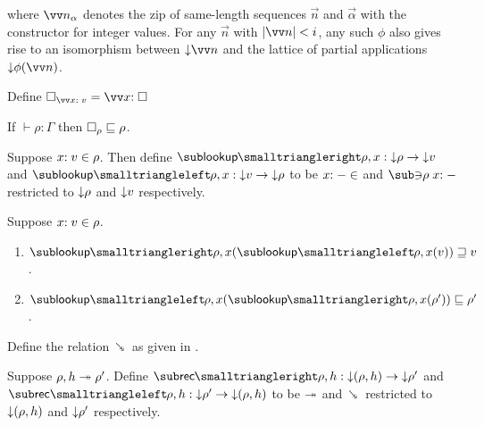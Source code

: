 \noindent where $\vec{\annInt{n}{\alpha}}$ denotes the zip of same-length sequences $\vec{n}$ and $\vec{\alpha}$ with the constructor for integer values. For any $\vec{n}$ with $\length{\vec{n}} \numlt i$, any such $\phi$ also gives rise to an isomorphism between $\Below{\vec{n}}$ and the lattice of partial applications $\Below{\exPrimOp{\phi}{\vec{n}}}$.





\begin{definition}
Define $\hole_{\vec{\bind{x}{v}}} = \vec{\bind{x}{\hole}}$
\end{definition}

\begin{lemma}
\label{lem:core-language:hole-env}If $\vdash \rho: \Gamma$ then $\square_{\rho} \sqsubseteq \rho$.
\end{lemma}

\begin{definition}
   Suppose $x{:}\;v\in{\rho}$. Then define $\envLookupFwdF{\rho,x}: \Below{\rho} \to \Below{v}$ and $\envLookupBwdF{\rho,x}: \Below{v} \to \Below{\rho}$ to be $x{:}\;-\in$ and $\envLookupBwdR{\rho}\bind{x}{-}$ restricted to ${\downarrow}{\rho}$ and ${\downarrow}{v}$ respectively.
\end{definition}

\begin{lemma}
\label{lem:core-language:env-get-put}Suppose $x{:}\;v\in{\rho}$.
\begin{enumerate}
   \item \label{lem:core-language:env-get-put:1} $\envLookupFwdF{\rho,x}(\envLookupBwdF{\rho,x}(v)) \geq v$.
   \item \label{lem:core-language:env-get-put:2} $\envLookupBwdF{\rho,x}(\envLookupFwdF{\rho,x}(\rho')) \leq \rho'$.
\end{enumerate}
\end{lemma}

\begin{definition}
   \label{def:core-language:closeDefs-bwd}
   Define the relation $\closeDefsBwdR$ as given in .
\end{definition}

\begin{definition}
   Suppose $\rho, h \twoheadrightarrow \rho'$. Define $\closeDefsFwdF{\rho,h}: \Below{(\rho, h)} \to \Below{\rho'}$ and $\closeDefsBwdF{\rho,h}: \Below{\rho'} \to \Below{(\rho, h)}$ to be $\twoheadrightarrow$ and $\closeDefsBwdR$ restricted to ${\downarrow}{(\rho, h)}$ and ${\downarrow}{\rho'}$ respectively.
\end{definition}


